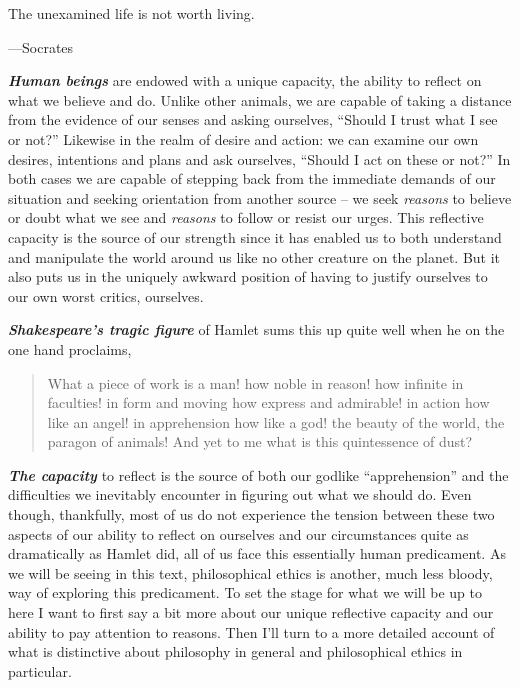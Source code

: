 \documentclass[]{book}
\newenvironment{epigraph}%
{
\begin{flushright}
\begin{minipage}{20em}
\begin{flushright}
\itshape
}%
{
\end{flushright}
\end{minipage}
\end{flushright}
\vspace{1em}
}
\begin{document}
\begin{epigraph}
The unexamined life is not worth living.

---Socrates
\end{epigraph}

\textbf{\emph{Human beings}} are endowed with a unique capacity, the ability to reflect on what we believe and do. Unlike other animals, we are capable of taking a distance from the evidence of our senses and asking ourselves, ``Should I trust what I see or not?'' Likewise in the realm of desire and action: we can examine our own desires, intentions and plans and ask ourselves, ``Should I act on these or not?'' In both cases we are capable of stepping back from the immediate demands of our situation and seeking orientation from another source -- we seek \emph{reasons} to believe or doubt what we see and \emph{reasons} to follow or resist our urges. This reflective capacity is the source of our strength since it has enabled us to both understand and manipulate the world around us like no other creature on the planet. But it also puts us in the uniquely awkward position of having to justify ourselves to our own worst critics, ourselves.

\textbf{\emph{Shakespeare's tragic figure}} of Hamlet sums this up quite well when he on the one hand proclaims,

\begin{quote}
What a piece of work is a man! how noble in reason! how infinite in faculties! in form and moving how express and admirable! in action how like an angel! in apprehension how like a god! the beauty of the world, the paragon of animals! And yet to me what is this quintessence of dust?
\end{quote}

\textbf{\emph{The capacity}} to reflect is the source of both our godlike ``apprehension'' and the difficulties we inevitably encounter in figuring out what we should do. Even though, thankfully, most of us do not experience the tension between these two aspects of our ability to reflect on ourselves and our circumstances quite as dramatically as Hamlet did, all of us face this essentially human predicament. As we will be seeing in this text, philosophical ethics is another, much less bloody, way of exploring this predicament. To set the stage for what we will be up to here I want to first say a bit more about our unique reflective capacity and our ability to pay attention to reasons. Then I'll turn to a more detailed account of what is distinctive about philosophy in general and philosophical ethics in particular.
\end{document}

